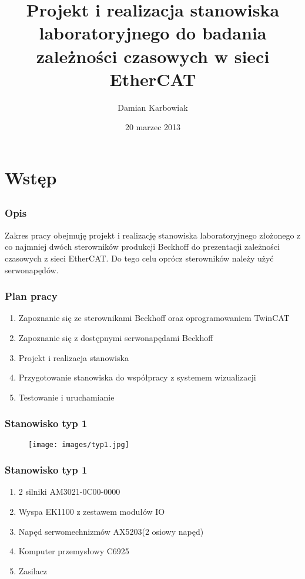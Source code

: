 \documentclass[ucs]{beamer}
\title{Projekt i realizacja stanowiska laboratoryjnego do badania zależności czasowych w sieci EtherCAT}
\author{Damian Karbowiak}
\date{20 marzec 2013}
\begin{document}
\begin{frame}
  \titlepage
\end{frame}

\section{Wstęp}
\subsection{}
\begin{frame}
\frametitle{Opis}
Zakres pracy obejmuję projekt i realizację stanowiska laboratoryjnego złożonego z co najmniej dwóch sterowników produkcji Beckhoff do prezentacji zależności czasowych z sieci EtherCAT. Do tego celu oprócz sterowników należy użyć serwonapędów.
\end{frame}

\begin{frame}
\frametitle{Plan pracy}
\begin{enumerate}
    \item Zapoznanie się ze sterownikami Beckhoff oraz oprogramowaniem TwinCAT
    \item Zapoznanie się z dostępnymi serwonapędami Beckhoff
    \item Projekt i realizacja stanowiska
    \item Przygotowanie stanowiska do współpracy z systemem wizualizacji
    \item Testowanie i uruchamianie
\end{enumerate}
\end{frame}

\begin{frame}
\frametitle{Stanowisko typ 1}
\begin{figure}[!htb]	
\centering 	          
\texttt{[image: images/typ1.jpg]}
\end{figure}
\end{frame}

\begin{frame}
\frametitle{Stanowisko typ 1}
\begin{enumerate}
    \item 2 silniki AM3021-0C00-0000
    \item Wyspa EK1100 z zestawem modułów IO
    \item Napęd serwomechnizmów AX5203(2 osiowy napęd)
    \item Komputer przemysłowy C6925
    \item Zasilacz
\end{enumerate}
\end{frame}
\end{document}
